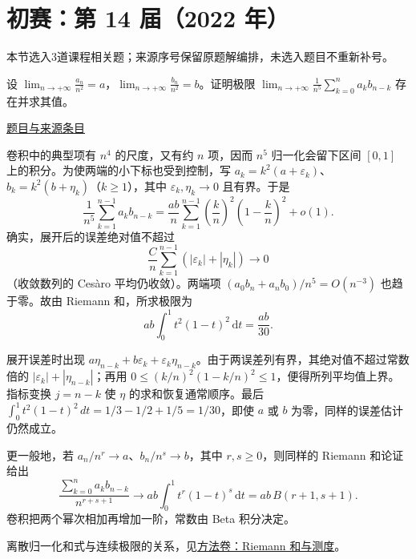 \documentclass[12pt,fontset=fandol]{ctexart}
\begin{document}
\section{初赛：第 14 届（2022 年）}

本节选入3道课程相关题；来源序号保留原题解编排，未选入题目不重新补号。

\begin{example}[来源序号2]\label{ex:ch04-14th-A:2}\label{pr:ch04-14th-A:2}

设 $\lim_{n\rightarrow+\infty}\frac{a_{n}}{n^{2}}=a$，$\lim_{n\rightarrow+\infty}\frac{b_{n}}{n^{2}}=b$。证明极限 $\lim_{n\rightarrow+\infty}\frac{1}{n^{5}}\sum_{k=0}^{n}a_{k}b_{n-k}$ 存在并求其值。

\par\href{https://github.com/lzxcr/cmc-mathematics/blob/64916fa1fdbc3e444a652eca204d5669058ee321/src/problems/preliminary/14/02.md}{题目与来源条目}

\end{example}

\begin{solve}\label{ans:ch04-14th-A:2}

卷积中的典型项有 $n^4$ 的尺度，又有约 $n$ 项，因而 $n^5$ 归一化会留下区间 $[0,1]$ 上的积分。为使两端的小下标也受到控制，写 $a_k=k^2(a+\varepsilon_k)$、$b_k=k^2(b+\eta_k)$（$k\geq1$），其中 $\varepsilon_k,\eta_k\to0$ 且有界。于是
\[
\frac1{n^5}\sum_{k=1}^{n-1}a_kb_{n-k}
=\frac{ab}{n}\sum_{k=1}^{n-1}
 \left(\frac kn\right)^2\left(1-\frac kn\right)^2+o(1).
\]
确实，展开后的误差绝对值不超过
\[
\frac Cn\sum_{k=1}^{n-1}(|\varepsilon_k|+|\eta_k|)\longrightarrow0
\]
（收敛数列的 Cesàro 平均仍收敛）。两端项 $(a_0b_n+a_nb_0)/n^5=O(n^{-3})$ 也趋于零。故由 Riemann 和，所求极限为
\[
ab\int_0^1t^2(1-t)^2\,\mathrm dt=\frac{ab}{30}.
\]

展开误差时出现 $a\eta_{n-k}+b\varepsilon_k+\varepsilon_k\eta_{n-k}$。由于两误差列有界，其绝对值不超过常数倍的 $|\varepsilon_k|+|\eta_{n-k}|$；再用 $0\le(k/n)^2(1-k/n)^2\le1$，便得所列平均值上界。指标变换 $j=n-k$ 使 $\eta$ 的求和恢复通常顺序。最后 $\int_0^1t^2(1-t)^2\,dt=1/3-1/2+1/5=1/30$，即使 $a$ 或 $b$ 为零，同样的误差估计仍然成立。

\end{solve}

\begin{remark}[方法与条件]更一般地，若 $a_n/n^r\to a$、$b_n/n^s\to b$，其中 $r,s\geq0$，则同样的 Riemann 和论证给出
\[
\frac{\sum_{k=0}^n a_kb_{n-k}}{n^{r+s+1}}
\longrightarrow ab\int_0^1t^r(1-t)^s\,\mathrm dt
=ab\,B(r+1,s+1).
\]
卷积把两个幂次相加再增加一阶，常数由 Beta 积分决定。

离散归一化和式与连续极限的关系，见\hyperref[app:integration-riemann]{方法卷：Riemann 和与测度}。\end{remark}
\end{document}

